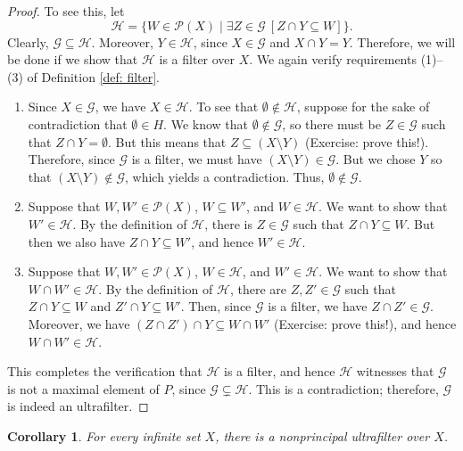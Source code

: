 \documentclass[a4paper]{memoir}
\newtheorem{corollary}[theorem]{Corollary}
\theoremstyle{definition}
\newcommand{\mc}{\mathcal}
\newcommand{\power}{\ensuremath{\mathscr{P}}}
\begin{document}
\begin{proof}
  To see this, let 
  \[
    \mathcal{H} = \{W \in \power(X) \mid \exists Z \in \mc{G} \ [Z \cap Y \subseteq W]\}.
  \]
  Clearly, $\mathcal{G} \subseteq \mathcal{H}$. Moreover, $Y \in \mathcal{H}$, since 
  $X \in \mathcal{G}$ and $X \cap Y = Y$. Therefore, we will be done if we show that $\mathcal{H}$ 
  is a filter over $X$. We again verify requirements (1)--(3) of Definition \ref{def: filter}.
  \begin{enumerate}
    \item Since $X \in \mc{G}$, we have $X \in \mc{H}$. To see that $\emptyset \notin \mc{H}$, suppose 
    for the sake of contradiction that $\emptyset \in H$. We know that $\emptyset \notin \mc{G}$, 
    so there must be $Z \in \mc{G}$ such that $Z \cap Y = \emptyset$. But this means 
    that $Z \subseteq (X \setminus Y)$ (Exercise: prove this!). Therefore, since 
    $\mc{G}$ is a filter, we must have $(X \setminus Y) \in \mc{G}$. But we chose $Y$ so that 
    $(X \setminus Y) \notin \mc{G}$, which yields a contradiction. Thus, $\emptyset \notin \mc{G}$.
    \item Suppose that $W, W' \in \power(X)$, $W \subseteq W'$, and $W \in \mc{H}$. 
    We want to show that $W' \in \mc{H}$. By the definition of $\mc{H}$, 
    there is $Z \in \mc{G}$ such that 
    $Z \cap Y \subseteq W$. But then we also have $Z \cap Y \subseteq W'$, and hence 
    $W' \in \mc{H}$.
    \item Suppose that $W,W' \in \power(X)$, $W \in \mc{H}$, and $W' \in \mc{H}$. We want to show 
    that $W \cap W' \in \mc{H}$. By the definition of $\mc{H}$, there are $Z,Z' \in \mc{G}$ 
    such that $Z \cap Y \subseteq W$ and $Z' \cap Y \subseteq W'$. Then, since $\mc{G}$ is 
    a filter, we have $Z \cap Z' \in \mc{G}$. Moreover, we have 
    $(Z \cap Z') \cap Y \subseteq W \cap W'$ (Exercise: prove this!), and hence 
    $W \cap W' \in \mc{H}$.
  \end{enumerate}
  This completes the verification that $\mc{H}$ is a filter, and hence $\mc{H}$ witnesses that 
  $\mc{G}$ is not a maximal element of $P$, since $\mc{G} \subsetneq \mc{H}$. This is a contradiction; 
  therefore, $\mc{G}$ is indeed an ultrafilter.
\end{proof}

\begin{corollary}
  For every infinite set $X$, there is a nonprincipal ultrafilter over $X$.
\end{corollary}
\end{document}

